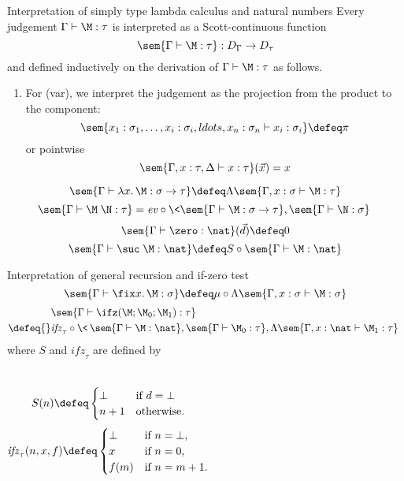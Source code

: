 \begin{frame}{Interpretation of simply type lambda calculus
  and natural numbers}
  Every judgement $\Gamma \vdash \M : \tau$ is interpreted as
  a Scott-continuous function
  \[
    \sem{\Gamma \vdash \M : \tau} : D_\Gamma \to D_{\tau}
  \]
  and defined inductively on the derivation of $\Gamma \vdash \M:\tau$ as
  follows. 

  \begin{enumerate}
    \item For (var), we interpret the judgement as the projection
      from the product to the component:
      \[
        \sem{x_1 : \sigma_1, \ldots, x_i : \sigma_i, ldots, x_n : \sigma_n \vdash x_i : \sigma_i} \defeq \pi 
      \]
      or pointwise
      \[
        \sem{\Gamma, x : \tau, \Delta \vdash x : \tau}(\vec{x}) = x
      \]
  \end{enumerate}
  \[ 
    \sem{\Gamma \vdash \lambda x.\, \M : \sigma \to \tau} \defeq
    \Lambda\sem{\Gamma, x : \sigma \vdash \M : \tau}
  \]
  \[
    \sem{\Gamma \vdash \M\;\N : \tau} = \mathit{ev}
    \circ \<\sem{\Gamma \vdash
      \M : \sigma \to \tau}, \sem{\Gamma \vdash \N : \sigma}\>
  \]
  \[
    \sem{\Gamma \vdash \zero : \nat}(\vec{d}) \defeq 0
  \]
  \[
    \sem{\Gamma \vdash \suc\;\M : \nat} \defeq S \circ \sem{\Gamma
      \vdash \M : \nat}
  \]
\end{frame}

\begin{frame}{Interpretation of general recursion and if-zero test}
  \[
    \sem{\Gamma \vdash \fix x.\, \M : \sigma} \defeq
    \mu \circ \Lambda\sem{\Gamma, x : \sigma \vdash \M : \sigma}
  \]
  \begin{align*}
    & \sem{\Gamma \vdash \ifz(\M; \M_0; \M_1) : \tau} \\
    \defeq{} & \mathit{ifz}_\tau \circ \<\,
    \sem{\Gamma \vdash \M  : \nat},
    \sem{\Gamma \vdash \M_0 : \tau},
    \Lambda\sem{\Gamma, x : \nat \vdash \M_1 : \tau}\,\>
  \end{align*}
  where $S$ and $\mathit{ifz}_\tau$ are defined by
  \begin{columns}
      \[
        S(n) \defeq
        \begin{cases}
          \bot & \text{if $d = \bot$} \\
          n + 1 & \text{otherwise.}
        \end{cases}
      \]
      \[
        \mathit{ifz}_\tau(n, x, f) \defeq
        \begin{cases}
          \bot & \text{if $n = \bot$,} \\
          x   & \text{if $n = 0$,} \\
          f(m) & \text{if $n = m +1$.} \\
        \end{cases}
      \]
  \end{columns}
\end{frame}

